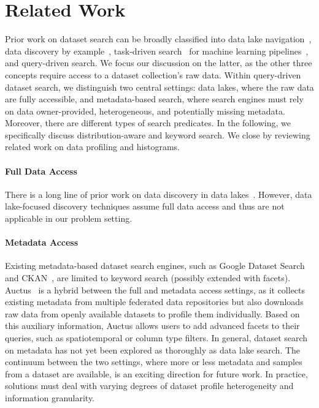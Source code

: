 
\section{Related Work}
\label{sec:related_work}

Prior work on dataset search can be broadly classified into data lake navigation~\cite{nargesian_data_2023, nargesian_organizing_2020, ouellette_ronin_2021}, data discovery by example~\cite{rezig_dice_2021}, task-driven search~\cite{galhotra_metam_2023} for machine learning pipelines~\cite{behme_art_2023}, and query-driven search.
We focus our discussion on the latter, as the other three concepts require access to a dataset collection's raw data.
Within query-driven dataset search, we distinguish two central settings: data lakes, where the raw data are fully accessible, and metadata-based search, where search engines must rely on data owner-provided, heterogeneous, and potentially missing metadata.
Moreover, there are different types of search predicates.
In the following, we specifically discuss dis\-tri\-bu\-tion-aware and keyword search.
We close by reviewing related work on data profiling and histograms.

\paragraph{Full Data Access}
There is a long line of prior work on data discovery in data lakes~\cite{bharadwaj_discovering_2021, bogatu_dataset_2020, castro_fernandez_aurum_2018, esmailoghli_mate_2022, gong_ver_2023, koutras_valentine_2021, miller_making_2018, zhang_dsdd_2021, zhang_finding_2020, gong_nexus_2024}.
However, data lake-focused discovery techniques assume full data access and thus are not applicable in our problem setting.

\paragraph{Metadata Access}
Existing metadata-based dataset search engines, such as Google Dataset Search~\cite{noy_google_2019} and CKAN~\cite{open_knowledge_foundation_ckan_2022}, are limited to keyword search (possibly extended with facets).
Auctus~\cite{castelo_auctus_2021} is a hybrid between the full and metadata access settings, as it collects existing metadata from multiple federated data repositories but also downloads raw data from openly available datasets to profile them individually.
Based on this auxiliary information, Auctus allows users to add advanced facets to their queries, such as spatiotemporal or column type filters.
In general, dataset search on metadata has not yet been explored as thoroughly as data lake search.
The continuum between the two settings, where more or less metadata and samples from a dataset are available, is an exciting direction for future work.
In practice, solutions must deal with varying degrees of dataset profile heterogeneity and information granularity.

